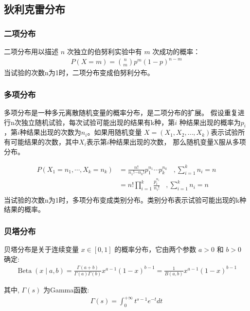 \documentclass[UTF8]{ctexart}
\begin{document}
\subsection{狄利克雷分布}

\subsubsection{二项分布}
二项分布用以描述 $n$ 次独立的伯努利实验中有 $m$ 次成功的概率：
$$
\begin{aligned}
P(X=m)=\binom{n}{m} p^{m}(1-p)^{n-m}
\end{aligned}
$$
当试验的次数n为1时，二项分布变成伯努利分布。

\subsubsection{多项分布}
多项分布是一种多元离散随机变量的概率分布，是二项分布的扩展。
假设重复进行n次独立随机试验，每次试验可能出现的结果有k种，第$i$
种结果出现的概率为$p_i$，第$i$种结果出现的次数为$n_i$。如果用随机变量
$X=(X_1,X_2,...,X_k)$表示试验所有可能结果的次数，其中$X_i$表示第$i$种结果出现的次数，
那么随机变量X服从多项分布。

$$
\begin{aligned}
    P\left(X_{1}=n_{1}, \cdots, X_{k}=n_{k}\right)&= \frac{n !}{n_{1} ! \cdots n_{k} !} p_{1}^{n_{1}} \cdots p_{k}^{n_{k}} ~~~~ , \sum_{i=1}^{k} n_{i}=n \\ 
&=n ! \prod_{i=1}^{k} \frac{p_{i}^{n_{i}}}{n_{i} !} ~~~~ , \sum_{i=1}^{k} n_{i}=n \\ 
\end{aligned}
$$
当试验的次数n为1时，多项分布变成类别分布。类别分布表示试验可能出现的k种结果的概率。

\subsubsection{贝塔分布}
贝塔分布是关于连续变量 $x \in[0,1]$ 的概率分布，它由两个参数 $a>0$ 和 $b>0$ 确定:
$$
\begin{aligned}
\operatorname{Beta}(x \mid a, b)=\frac{\Gamma(a+b)}{\Gamma(a) \Gamma(b)} x^{a-1}(1-x)^{b-1}=\frac{1}{B(a, b)} x^{a-1}(1-x)^{b-1}
\end{aligned}
$$

其中, $\Gamma(s)$ 为Gamma函数:
$$
\begin{aligned}
\Gamma(s)=\int_{0}^{+\infty} t^{s-1} e^{-t} d t
\end{aligned}
$$
\end{document}
